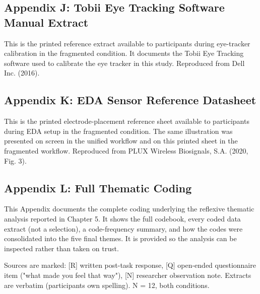 \documentclass[
]{article}
\begin{document}
\clearpage
\hypertarget{appendix-h-tobii-eye-tracking-software-manual-extract}{%
\subsection{\texorpdfstring{Appendix J: Tobii Eye Tracking Software Manual Extract }{Appendix J: Tobii Eye Tracking Software Manual Extract }}\label{appendix-h-tobii-eye-tracking-software-manual-extract}}

This is the printed reference extract available to participants during eye-tracker calibration in the fragmented condition. It documents the Tobii Eye Tracking software used to calibrate the eye tracker in this study. Reproduced from Dell Inc. (2016).





\clearpage
\hypertarget{appendix-i-eda-sensor-reference-datasheet}{%
\subsection{Appendix K: EDA Sensor Reference Datasheet}\label{appendix-i-eda-sensor-reference-datasheet}}

This is the printed electrode-placement reference sheet available to participants during EDA setup in the fragmented condition. The same illustration was presented on screen in the unified workflow and on this printed sheet in the fragmented workflow. Reproduced from PLUX Wireless Biosignals, S.A. (2020, Fig. 3).





\clearpage
\hypertarget{appendix-j-full-thematic-coding}{%
\subsection{Appendix L: Full Thematic Coding}\label{appendix-j-full-thematic-coding}}

This Appendix documents the complete coding underlying the reflexive thematic analysis reported in Chapter 5. It shows the full codebook, every coded data extract (not a selection), a code-frequency summary, and how the codes were consolidated into the five final themes. It is provided so the analysis can be inspected rather than taken on trust.

Sources are marked: {[}R{]} written post-task response, {[}Q{]} open-ended questionnaire item ("what made you feel that way"), {[}N{]} researcher observation note. Extracts are verbatim (participants\textquotesingle{} own spelling). N = 12, both conditions.
\end{document}
